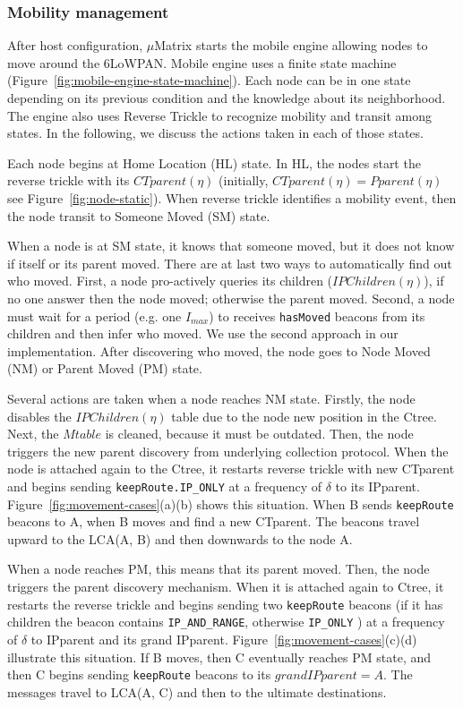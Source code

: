 \subsubsection{Mobility management}

After host configuration, $\mu$Matrix starts the mobile engine allowing nodes to move around the 6LoWPAN. Mobile engine uses a finite state machine (Figure~\ref{fig:mobile-engine-state-machine}). Each node can be in one state depending on its previous condition and the knowledge about its neighborhood. The engine also uses Reverse Trickle to recognize mobility and transit among states. In the following, we discuss the actions taken in each of those states.  

Each node begins at Home Location (HL) state. In HL, the nodes start the reverse trickle with its $CTparent(\eta)$ (initially, $CTparent(\eta) = Pparent(\eta)$ see Figure~\ref{fig:node-static}). When reverse trickle identifies a mobility event, then the node transit to Someone Moved (SM) state.

When a node is at SM state, it knows that someone moved, but it does not know if itself or its parent moved. There are at last two ways to automatically find out who moved. First, a node pro-actively queries its children ($IPChildren(\eta)$), if no one answer then the node moved; otherwise the parent moved. Second, a node must wait for a period (e.g. one $I_{max}$) to receives \texttt{hasMoved} beacons from its children and then infer who moved. We use the second approach in our implementation. After discovering who moved, the node goes to Node Moved (NM) or Parent Moved (PM) state. 

Several actions are taken when a node reaches NM state. Firstly, the node disables the  $IPChildren(\eta)$ table due to the node new position in the Ctree. Next, the $Mtable$ is cleaned, because it must be outdated. Then, the node triggers the new parent discovery from underlying collection protocol. When the node is attached again to the Ctree, it restarts reverse trickle with new CTparent and begins sending \texttt{keepRoute.IP\_ONLY} at a frequency of $\delta$ to its IPparent.  Figure~\ref{fig:movement-cases}(a)(b) shows this situation. When B sends \texttt{keepRoute} beacons to A, when B moves and find a new CTparent. The beacons travel upward to the LCA(A, B) and then downwards to the node A.  

When a node reaches PM, this means that its parent moved. Then, the node triggers the parent discovery mechanism. When it is attached again to Ctree, it restarts the reverse trickle and begins sending two \texttt{keepRoute} beacons (if it has children the beacon contains \texttt{IP\_AND\_RANGE}, otherwise \texttt{IP\_ONLY} ) at a frequency of $\delta$ to IPparent and its grand IPparent. Figure~\ref{fig:movement-cases}(c)(d) illustrate this situation. If B moves, then C eventually reaches PM state, and then C begins sending \texttt{keepRoute} beacons to its $grandIPparent = A$. The messages travel to LCA(A, C) and then to the ultimate destinations. 

